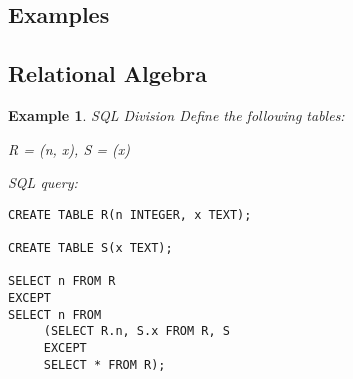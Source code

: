 \documentclass[landscape, letterpaper]{extarticle}
\begin{document}
\begin{multicols}{3}
    \section*{Examples}
    \newtheorem{example}{Example}
    \subsection*{Relational Algebra}
    \begin{example}
        SQL Division
        Define the following tables:

        R = (n, x), S = (x)

        SQL query:
        \begin{verbatim}
CREATE TABLE R(n INTEGER, x TEXT);

CREATE TABLE S(x TEXT);

SELECT n FROM R
EXCEPT
SELECT n FROM
     (SELECT R.n, S.x FROM R, S
     EXCEPT
     SELECT * FROM R);
        \end{verbatim}
    \end{example}
\end{multicols}
\end{document}
